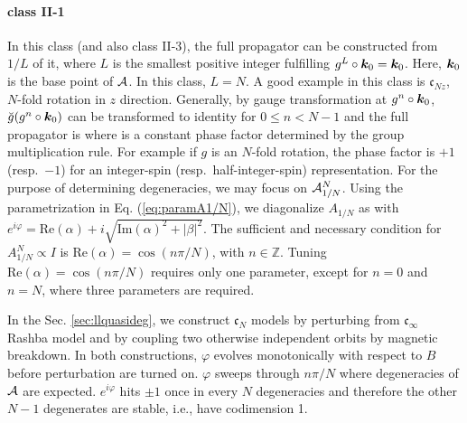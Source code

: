 \documentclass[aps, showpacs, twocolumn, notitlepage, superscriptaddress]{revtex4-1}
\begin{document}
\paragraph*{class II-1} In this class (and also class II-3), the full propagator can be constructed from $1/L$ of it, where $L$ is the smallest positive integer fulfilling $g^L\circ \boldsymbol{k}_0=\boldsymbol{k}_0$. Here, $\boldsymbol{k}_0$ is the base point of ${\cal A}$. In this class, $L=N$. A good example in this class is $\mathfrak{c}_{Nz}$, $N$-fold rotation in $z$ direction. Generally, by gauge transformation at $g^n\circ \boldsymbol{k}_0$, $\breve{g}(g^n\circ \boldsymbol{k}_0)$ can be transformed to identity for $0 \le n < N-1$ and the full propagator is
where 
is a constant phase factor determined by the group multiplication rule. For example if $g$ is an $N$-fold rotation,  the phase factor is $+1$ (resp.\ $-1$) for an integer-spin (resp.\ half-integer-spin) representation. For the purpose of determining degeneracies, we may focus on
${\cal A}_{1/N}^N$. Using the parametrization in Eq. (\ref{eq:paramA1/N}), we diagonalize $A_{1/N}$ as 
with $e^{i\varphi}=\text{Re}(\alpha)+i\sqrt{\text{Im}(\alpha)^2+|\beta|^2}$. The sufficient and necessary condition for $A_{1/N}^N \propto I$ is $\text{Re}(\alpha)=\cos(n\pi/N)$, with $n\in\mathbb{Z}$. Tuning $\text{Re}(\alpha)=\cos(n\pi/N)$ requires only one parameter, except for $n=0$ and $n=N$, where three parameters are required.

In the Sec. \ref{sec:llquasideg}, we construct $\mathfrak{c}_N$ models by perturbing from $\mathfrak{c}_\infty$ Rashba model and by coupling two otherwise independent orbits by magnetic breakdown. In both constructions, $\varphi$ evolves monotonically with respect to $B$ before perturbation are turned on. $\varphi$ sweeps through $n\pi/N$ where degeneracies of ${\cal A}$ are expected. $e^{i\varphi}$ hits $\pm 1$ once in every $N$ degeneracies and therefore the other $N-1$ degenerates are stable, i.e., have codimension 1.
\end{document}
